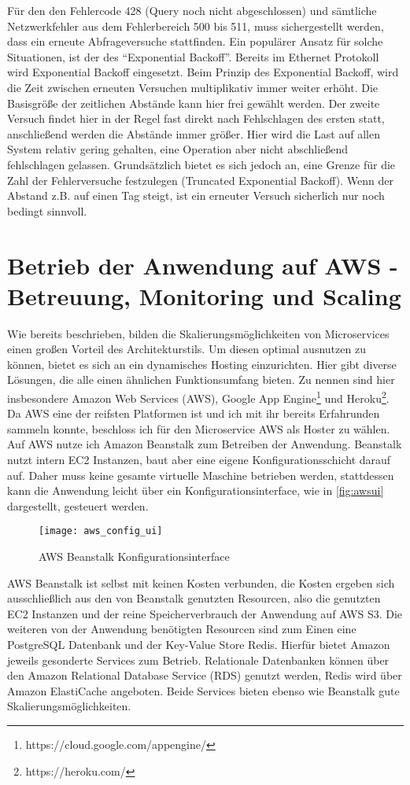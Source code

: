 Für den den Fehlercode 428 (Query noch nicht abgeschlossen) und sämtliche Netzwerkfehler aus dem Fehlerbereich 500 bis 511, muss sichergestellt werden, dass ein erneute Abfrageversuche stattfinden.
Ein populärer Ansatz für solche Situationen, ist der des ``Exponential Backoff''\cite{expbackoff}. Bereits im Ethernet Protokoll wird Exponential Backoff eingesetzt\cite{etherbackoff}. Beim Prinzip des Exponential Backoff, wird die Zeit zwischen erneuten Versuchen multiplikativ immer weiter erhöht. Die Basisgröße der zeitlichen Abstände kann hier frei gewählt werden. Der zweite Versuch findet hier in der Regel fast direkt nach Fehlschlagen des ersten statt, anschließend werden die Abstände immer größer. Hier wird die Last auf allen System relativ gering gehalten, eine Operation aber nicht abschließend fehlschlagen gelassen. Grundsätzlich bietet es sich jedoch an, eine Grenze für die Zahl der Fehlerversuche festzulegen (Truncated Exponential Backoff). Wenn der Abstand z.B. auf einen Tag steigt, ist ein erneuter Versuch sicherlich nur noch bedingt sinnvoll.

\section{Betrieb der Anwendung auf AWS - Betreuung, Monitoring und Scaling}
Wie bereits beschrieben, bilden die Skalierungsmöglichkeiten von Microservices einen großen Vorteil des Architekturstils. Um diesen optimal ausnutzen zu können, bietet es sich an ein dynamisches Hosting einzurichten. Hier gibt diverse Lösungen, die alle einen ähnlichen Funktionsumfang bieten. Zu nennen sind hier insbesondere Amazon Web Services (AWS), Google App Engine\footnote{https://cloud.google.com/appengine/} und Heroku\footnote{https://heroku.com/}. Da AWS eine der reifsten Platformen ist und ich mit ihr bereits Erfahrunden sammeln konnte, beschloss ich für den Microservice AWS als Hoster zu wählen.
Auf AWS nutze ich Amazon Beanstalk zum Betreiben der Anwendung. Beanstalk nutzt intern EC2 Instanzen, baut aber eine eigene Konfigurationsschicht darauf auf. Daher muss keine gesamte virtuelle Maschine betrieben werden, stattdessen kann die Anwendung leicht über ein Konfigurationsinterface, wie in \autoref{fig:awsui} dargestellt, gesteuert werden.

\begin{figure}[!ht]
    \centering
    \caption{AWS Beanstalk Konfigurationsinterface}
    \label{fig:awsui}
    \texttt{[image: aws\_config\_ui]}
\end{figure}
AWS Beanstalk ist selbst mit keinen Kosten verbunden, die Kosten ergeben sich ausschließlich aus den von Beanstalk genutzten Resourcen, also die genutzten EC2 Instanzen und der reine Speicherverbrauch der Anwendung auf AWS S3. Die weiteren von der Anwendung benötigten Resourcen sind zum Einen eine PostgreSQL Datenbank und der Key-Value Store Redis. Hierfür bietet Amazon jeweils gesonderte Services zum Betrieb. Relationale Datenbanken können über den Amazon Relational Database Service (RDS) genutzt werden, Redis wird über Amazon ElastiCache angeboten. Beide Services bieten ebenso wie Beanstalk gute Skalierungsmöglichkeiten.

